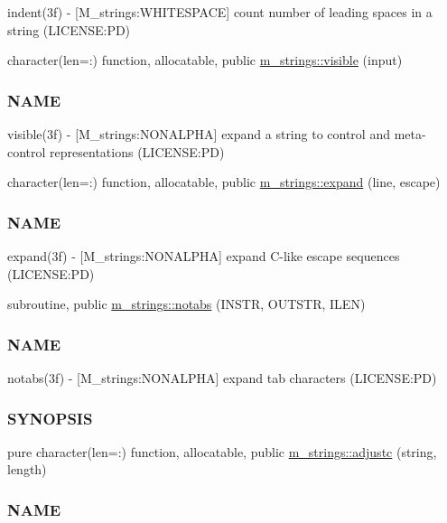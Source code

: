 \begin{DoxyCompactItemize}
\begin{DoxyCompactList}
indent(3f) -\/ \mbox{[}M\+\_\+strings\+:W\+H\+I\+T\+E\+S\+P\+A\+CE\mbox{]} count number of leading spaces in a string (L\+I\+C\+E\+N\+SE\+:PD) \end{DoxyCompactList}\item 
character(len=\+:) function, allocatable, public \mbox{\hyperlink{namespacem__strings_a791e24ceb690010fd42a6c1f48311b55}{m\+\_\+strings\+::visible}} (input)
\begin{DoxyCompactList}\small\item\em \subsubsection*{N\+A\+ME}

visible(3f) -\/ \mbox{[}M\+\_\+strings\+:N\+O\+N\+A\+L\+P\+HA\mbox{]} expand a string to control and meta-\/control representations (L\+I\+C\+E\+N\+SE\+:PD) \end{DoxyCompactList}\item 
character(len=\+:) function, allocatable, public \mbox{\hyperlink{namespacem__strings_a33b248107c1521272b55cda5c4077378}{m\+\_\+strings\+::expand}} (line, escape)
\begin{DoxyCompactList}\small\item\em \subsubsection*{N\+A\+ME}

expand(3f) -\/ \mbox{[}M\+\_\+strings\+:N\+O\+N\+A\+L\+P\+HA\mbox{]} expand C-\/like escape sequences (L\+I\+C\+E\+N\+SE\+:PD) \end{DoxyCompactList}\item 
subroutine, public \mbox{\hyperlink{namespacem__strings_a3bf44ac06a670f55830e17a6f1108b9c}{m\+\_\+strings\+::notabs}} (I\+N\+S\+TR, O\+U\+T\+S\+TR, I\+L\+EN)
\begin{DoxyCompactList}\small\item\em \subsubsection*{N\+A\+ME}

notabs(3f) -\/ \mbox{[}M\+\_\+strings\+:N\+O\+N\+A\+L\+P\+HA\mbox{]} expand tab characters (L\+I\+C\+E\+N\+SE\+:PD) \subsubsection*{S\+Y\+N\+O\+P\+S\+IS}\end{DoxyCompactList}\item 
pure character(len=\+:) function, allocatable, public \mbox{\hyperlink{namespacem__strings_a1cacb2e45c7e3d7ed4cc1b183c35f323}{m\+\_\+strings\+::adjustc}} (string, length)
\begin{DoxyCompactList}\small\item\em \subsubsection*{N\+A\+ME}


\end{DoxyCompactList}
\end{DoxyCompactItemize}
